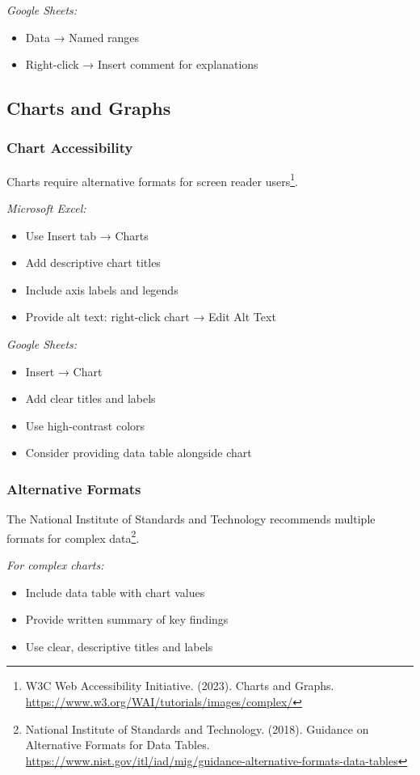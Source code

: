 \emph{Google Sheets:}
\begin{itemize}
\item Data → Named ranges
\item Right-click → Insert comment for explanations
\end{itemize}

\subsection{Charts and Graphs}

\subsubsection{Chart Accessibility}
Charts require alternative formats for screen reader users\footnote{W3C Web Accessibility Initiative. (2023). Charts and Graphs. \url{https://www.w3.org/WAI/tutorials/images/complex/}}.

\emph{Microsoft Excel:}
\begin{itemize}
\item Use Insert tab → Charts
\item Add descriptive chart titles
\item Include axis labels and legends
\item Provide alt text: right-click chart → Edit Alt Text
\end{itemize}

\emph{Google Sheets:}
\begin{itemize}
\item Insert → Chart
\item Add clear titles and labels
\item Use high-contrast colors
\item Consider providing data table alongside chart
\end{itemize}

\subsubsection{Alternative Formats}
The National Institute of Standards and Technology recommends multiple formats for complex data\footnote{National Institute of Standards and Technology. (2018). Guidance on Alternative Formats for Data Tables. \url{https://www.nist.gov/itl/iad/mig/guidance-alternative-formats-data-tables}}.

\emph{For complex charts:}
\begin{itemize}
\item Include data table with chart values
\item Provide written summary of key findings
\item Use clear, descriptive titles and labels
\end{itemize}

